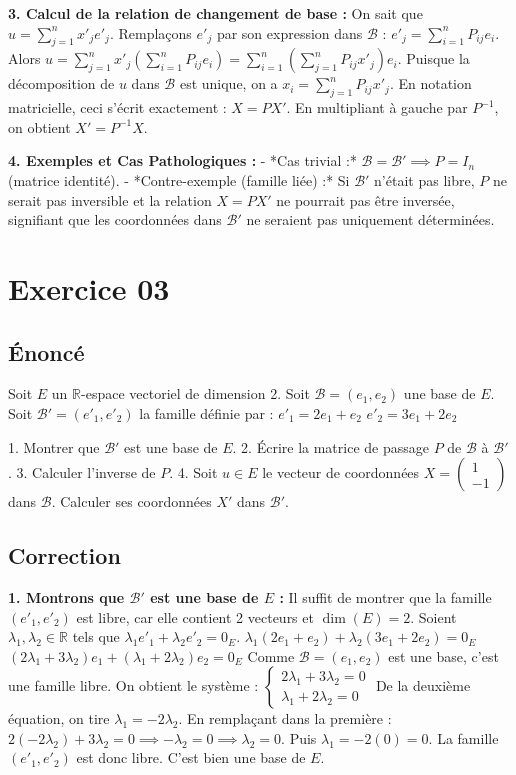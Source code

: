 \documentclass{report}
\begin{document}
\textbf{3. Calcul de la relation de changement de base :}
On sait que $u = \sum_{j=1}^n x'_j e'_j$.
Remplaçons $e'_j$ par son expression dans $\mathcal{B}$ : $e'_j = \sum_{i=1}^n P_{ij} e_i$.
Alors $u = \sum_{j=1}^n x'_j \left( \sum_{i=1}^n P_{ij} e_i \right) = \sum_{i=1}^n \left( \sum_{j=1}^n P_{ij} x'_j \right) e_i$.
Puisque la décomposition de $u$ dans $\mathcal{B}$ est unique, on a $x_i = \sum_{j=1}^n P_{ij} x'_j$.
En notation matricielle, ceci s'écrit exactement : $X = P X'$.
En multipliant à gauche par $P^{-1}$, on obtient $X' = P^{-1} X$.

\textbf{4. Exemples et Cas Pathologiques :}
- *Cas trivial :* $\mathcal{B} = \mathcal{B}' \implies P = I_n$ (matrice identité).
- *Contre-exemple (famille liée) :* Si $\mathcal{B}'$ n'était pas libre, $P$ ne serait pas inversible et la relation $X = P X'$ ne pourrait pas être inversée, signifiant que les coordonnées dans $\mathcal{B}'$ ne seraient pas uniquement déterminées.


\section*{Exercice 03}
\subsection*{Énoncé}
Soit $E$ un $\mathbb{R}$-espace vectoriel de dimension 2. Soit $\mathcal{B} = (e_1, e_2)$ une base de $E$.
Soit $\mathcal{B}' = (e'_1, e'_2)$ la famille définie par :
$e'_1 = 2e_1 + e_2$
$e'_2 = 3e_1 + 2e_2$

1. Montrer que $\mathcal{B}'$ est une base de $E$.
2. Écrire la matrice de passage $P$ de $\mathcal{B}$ à $\mathcal{B}'$.
3. Calculer l'inverse de $P$.
4. Soit $u \in E$ le vecteur de coordonnées $X = \begin{pmatrix} 1 \\ -1 \end{pmatrix}$ dans $\mathcal{B}$. Calculer ses coordonnées $X'$ dans $\mathcal{B}'$.

\subsection*{Correction}
\textbf{1. Montrons que $\mathcal{B}'$ est une base de $E$ :}
Il suffit de montrer que la famille $(e'_1, e'_2)$ est libre, car elle contient 2 vecteurs et $\dim(E) = 2$.
Soient $\lambda_1, \lambda_2 \in \mathbb{R}$ tels que $\lambda_1 e'_1 + \lambda_2 e'_2 = 0_E$.
$\lambda_1 (2e_1 + e_2) + \lambda_2 (3e_1 + 2e_2) = 0_E$
$(2\lambda_1 + 3\lambda_2)e_1 + (\lambda_1 + 2\lambda_2)e_2 = 0_E$
Comme $\mathcal{B} = (e_1, e_2)$ est une base, c'est une famille libre. On obtient le système :
$\begin{cases} 2\lambda_1 + 3\lambda_2 = 0 \\ \lambda_1 + 2\lambda_2 = 0 \end{cases}$
De la deuxième équation, on tire $\lambda_1 = -2\lambda_2$.
En remplaçant dans la première : $2(-2\lambda_2) + 3\lambda_2 = 0 \implies -\lambda_2 = 0 \implies \lambda_2 = 0$.
Puis $\lambda_1 = -2(0) = 0$.
La famille $(e'_1, e'_2)$ est donc libre. C'est bien une base de $E$.
\end{document}
